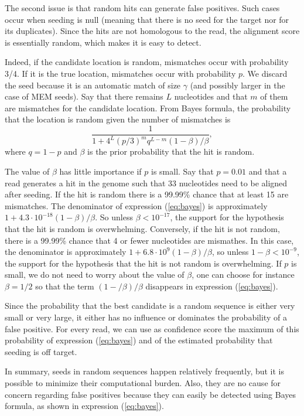 \documentclass{article}
\begin{document}
The second issue is that random hits can generate false positives. Such
cases occur when seeding is null (meaning that there is no seed for the
target nor for its duplicates). Since the hits are not homologous to the
read, the alignment score is essentially random, which makes it is easy to
detect.

Indeed, if the candidate location is random, mismatches occur with
probability 3/4. If it is the true location, mismatches occur with
probability $p$. We discard the seed because it is an automatic match of
size $\gamma$ (and possibly larger in the case of MEM seeds). Say that
there remains $L$ nucleotides and that $m$ of them are mismatches for the
candidate location. From Bayes formula, the probability that the location
is random given the number of mismatches is
\begin{equation}
\label{eq:bayes}
\frac{1}{1 + 4^L(p/3)^mq^{L-m}(1-\beta)/\beta},
\end{equation}
where $q=1-p$ and $\beta$ is the prior probability that the hit is
random.

The value of $\beta$ has little importance if $p$ is small. Say that
$p=0.01$ and that a read generates a hit in the genome such that 33
nucleotides need to be aligned after seeding. If the hit is random there
is a 99.99\% chance that at least 15 are mismatches. The denominator of
expression (\ref{eq:bayes}) is approximately $1 +
4.3\cdot10^{-18}(1-\beta)/\beta$. So unless $\beta < 10^{-17}$, the
support for the hypothesis that the hit is random is overwhelming.
Conversely, if the hit is not random, there is a 99.99\% chance that 4 or
fewer nucleotides are mismathes. In this case, the denominator is
approximately $1+6.8\cdot10^9(1-\beta)/\beta$, so unless $1-\beta <
10^{-9}$, the support for the hypothesis that the hit is not random is
overwhelming. If $p$ is small, we do not need to worry about the value of
$\beta$, one can choose for instance $\beta=1/2$ so that the term
$(1-/\beta)/\beta$ disappears in expression (\ref{eq:bayes}).

Since the probability that the best candidate is a random sequence is
either very small or very large, it either has no influence or dominates
the probability of a false positive. For every read, we can use as
confidence score the maximum of this probability of expression
(\ref{eq:bayes}) and of the estimated probability that seeding is off
target.

In summary, seeds in random sequences happen relatively frequently, but it
is possible to minimize their computational burden. Also, they are no
cause for concern regarding false positives because they can easily be
detected using Bayes formula, as shown in expression (\ref{eq:bayes}).
\end{document}
